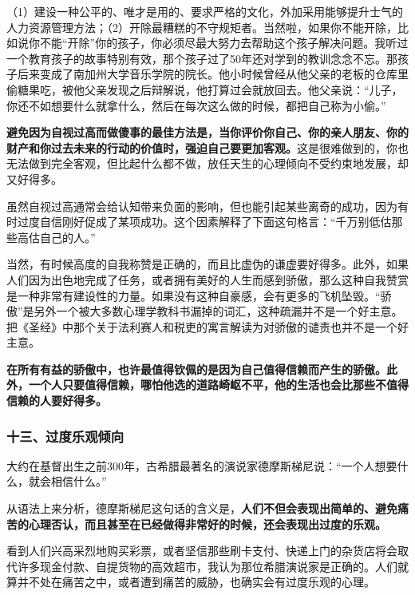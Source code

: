 （1）建设一种公平的、唯才是用的、要求严格的文化，外加采用能够提升士气的人力资源管理方法；（2）开除最糟糕的不守规矩者。当然啦，如果你不能开除，比如说你不能“开除”你的孩子，你必须尽最大努力去帮助这个孩子解决问题。我听过一个教育孩子的故事特别有效，那个孩子过了50年还对学到的教训念念不忘。那孩子后来变成了南加州大学音乐学院的院长。他小时候曾经从他父亲的老板的仓库里偷糖果吃，被他父亲发现之后辩解说，他打算过会就放回去。他父亲说：“儿子，你还不如想要什么就拿什么，然后在每次这么做的时候，都把自己称为小偷。”
\par

\textbf{避免因为自视过高而做傻事的最佳方法是，当你评价你自己、你的亲人朋友、你的财产和你过去未来的行动的价值时，强迫自己要更加客观。}这是很难做到的，你也无法做到完全客观，但比起什么都不做，放任天生的心理倾向不受约束地发展，却又好得多。
\par

虽然自视过高通常会给认知带来负面的影响，但也能引起某些离奇的成功，因为有时过度自信刚好促成了某项成功。这个因素解释了下面这句格言：“千万别低估那些高估自己的人。”
\par

当然，有时候高度的自我称赞是正确的，而且比虚伪的谦虚要好得多。此外，如果人们因为出色地完成了任务，或者拥有美好的人生而感到骄傲，那么这种自我赞赏是一种非常有建设性的力量。如果没有这种自豪感，会有更多的飞机坠毁。“骄傲”是另外一个被大多数心理学教科书漏掉的词汇，这种疏漏并不是一个好主意。把《圣经》中那个关于法利赛人和税吏的寓言解读为对骄傲的谴责也并不是一个好主意。
\par

\textbf{在所有有益的骄傲中，也许最值得钦佩的是因为自己值得信赖而产生的骄傲。此外，一个人只要值得信赖，哪怕他选的道路崎岖不平，他的生活也会比那些不值得信赖的人要好得多。}
\par

\subsubsection*{十三、过度乐观倾向}

大约在基督出生之前300年，古希腊最著名的演说家德摩斯梯尼说：“一个人想要什么，就会相信什么。”
\par

从语法上来分析，德摩斯梯尼这句话的含义是，\textbf{人们不但会表现出简单的、避免痛苦的心理否认，而且甚至在已经做得非常好的时候，还会表现出过度的乐观。}
\par

看到人们兴高采烈地购买彩票，或者坚信那些刷卡支付、快递上门的杂货店将会取代许多现金付款、自提货物的高效超市，我认为那位希腊演说家是正确的。人们就算并不处在痛苦之中，或者遭到痛苦的威胁，也确实会有过度乐观的心理。
\par

